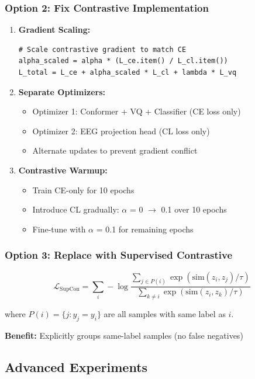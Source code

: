 \documentclass[12pt,a4paper]{article}
\begin{document}
\subsubsection{Option 2: Fix Contrastive Implementation}
\begin{enumerate}
    \item \textbf{Gradient Scaling:}
    \begin{lstlisting}
# Scale contrastive gradient to match CE
alpha_scaled = alpha * (L_ce.item() / L_cl.item())
L_total = L_ce + alpha_scaled * L_cl + lambda * L_vq
    \end{lstlisting}
    
    \item \textbf{Separate Optimizers:}
    \begin{itemize}
        \item Optimizer 1: Conformer + VQ + Classifier (CE loss only)
        \item Optimizer 2: EEG projection head (CL loss only)
        \item Alternate updates to prevent gradient conflict
    \end{itemize}
    
    \item \textbf{Contrastive Warmup:}
    \begin{itemize}
        \item Train CE-only for 10 epochs
        \item Introduce CL gradually: $\alpha$ = 0 $\rightarrow$ 0.1 over 10 epochs
        \item Fine-tune with $\alpha$ = 0.1 for remaining epochs
    \end{itemize}
\end{enumerate}

\subsubsection{Option 3: Replace with Supervised Contrastive}
\begin{equation}
\mathcal{L}_{\text{SupCon}} = \sum_{i} -\log \frac{\sum_{j \in P(i)} \exp(\text{sim}(z_i, z_j)/\tau)}{\sum_{k \neq i} \exp(\text{sim}(z_i, z_k)/\tau)}
\end{equation}

\noindent where $P(i) = \{j : y_j = y_i\}$ are all samples with same label as $i$.

\textbf{Benefit:} Explicitly groups same-label samples (no false negatives)

\subsection{Advanced Experiments}
\end{document}
